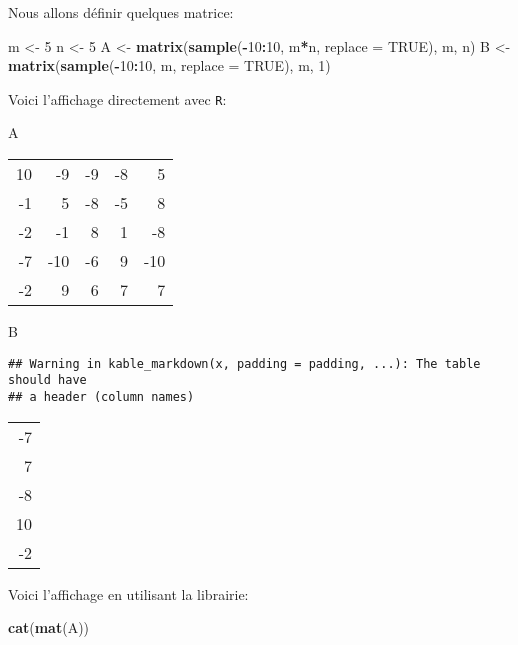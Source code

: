 \documentclass[]{article}
\newenvironment{Shaded}{\begin{snugshade}}{\end{snugshade}}
\newcommand{\KeywordTok}[1]{\textcolor[rgb]{0.13,0.29,0.53}{\textbf{#1}}}
\newcommand{\DataTypeTok}[1]{\textcolor[rgb]{0.13,0.29,0.53}{#1}}
\newcommand{\DecValTok}[1]{\textcolor[rgb]{0.00,0.00,0.81}{#1}}
\newcommand{\StringTok}[1]{\textcolor[rgb]{0.31,0.60,0.02}{#1}}
\newcommand{\OtherTok}[1]{\textcolor[rgb]{0.56,0.35,0.01}{#1}}
\newcommand{\OperatorTok}[1]{\textcolor[rgb]{0.81,0.36,0.00}{\textbf{#1}}}
\newcommand{\NormalTok}[1]{#1}
\begin{document}
Nous allons définir quelques matrice:

\begin{Shaded}
\begin{Highlighting}[]
\NormalTok{m <-}\StringTok{ }\DecValTok{5}
\NormalTok{n <-}\StringTok{ }\DecValTok{5}
\NormalTok{A <-}\StringTok{ }\KeywordTok{matrix}\NormalTok{(}\KeywordTok{sample}\NormalTok{(}\OperatorTok{-}\DecValTok{10}\OperatorTok{:}\DecValTok{10}\NormalTok{, m}\OperatorTok{*}\NormalTok{n, }\DataTypeTok{replace =} \OtherTok{TRUE}\NormalTok{), m, n)}
\NormalTok{B <-}\StringTok{ }\KeywordTok{matrix}\NormalTok{(}\KeywordTok{sample}\NormalTok{(}\OperatorTok{-}\DecValTok{10}\OperatorTok{:}\DecValTok{10}\NormalTok{, m, }\DataTypeTok{replace =} \OtherTok{TRUE}\NormalTok{), m, }\DecValTok{1}\NormalTok{)}
\end{Highlighting}
\end{Shaded}

Voici l'affichage directement avec \texttt{R}:

\begin{Shaded}
\begin{Highlighting}[]
\NormalTok{A}
\end{Highlighting}
\end{Shaded}

\begin{longtable}[]{@{}rrrrr@{}}
\toprule
10 & -9 & -9 & -8 & 5\tabularnewline
-1 & 5 & -8 & -5 & 8\tabularnewline
-2 & -1 & 8 & 1 & -8\tabularnewline
-7 & -10 & -6 & 9 & -10\tabularnewline
-2 & 9 & 6 & 7 & 7\tabularnewline
\bottomrule
\end{longtable}

\begin{Shaded}
\begin{Highlighting}[]
\NormalTok{B}
\end{Highlighting}
\end{Shaded}

\begin{verbatim}
## Warning in kable_markdown(x, padding = padding, ...): The table should have
## a header (column names)
\end{verbatim}

\begin{longtable}[]{@{}r@{}}
\toprule
-7\tabularnewline
7\tabularnewline
-8\tabularnewline
10\tabularnewline
-2\tabularnewline
\bottomrule
\end{longtable}

Voici l'affichage en utilisant la librairie:

\begin{Shaded}
\begin{Highlighting}[]
\KeywordTok{cat}\NormalTok{(}\KeywordTok{mat}\NormalTok{(A))}
\end{Highlighting}
\end{Shaded}
\end{document}
